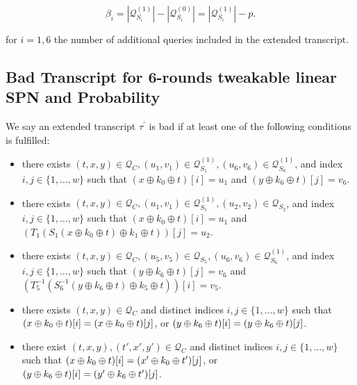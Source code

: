 $$
\beta_{i}=\left|\mathcal{Q}_{S_{i}}^{(1)}\right|-\left|\mathcal{Q}_{S_{i}}^{(0)}\right|=\left|\mathcal{Q}_{S_{i}}^{(1)}\right|-p.
$$

for $i=1, 6$ the number of additional queries included in the extended transcript.\\

\subsection{Bad Transcript for 6-rounds tweakable linear SPN and Probability}

\noindent We say an extended transcript $\tau^{\prime}$ is bad if at least one of the following conditions is fulfilled:

\begin{itemize}
  \item\eone
  there exists $(t, x, y) \in \mathcal{Q}_{C}, \left(u_{1}, v_{1}\right) \in \mathcal{Q}_{S_{1}}^{(1)}, \left(u_{6}, v_{6}\right) \in \mathcal{Q}_{S_{6}}^{(1)}$, and index $i, j \in \{1, \ldots, w\}$ such that $\left(x \oplus k_{0} \oplus t\right)[i]=u_1$ and $\left(y \oplus k_{6} \oplus t\right)[j]=v_6$.
  \item\etwo
  there exists $(t, x, y) \in \mathcal{Q}_{C}, \left(u_{1}, v_{1}\right) \in \mathcal{Q}_{S_{1}}^{(1)}, \left(u_{2}, v_{2}\right) \in \mathcal{Q}_{S_{2}}$, and index $i, j \in \{1, \ldots, w\}$ such that $\left(x \oplus k_{0} \oplus t\right)[i]=u_1$ and $\left(T_{1}\left(S_{1}\left(x \oplus k_{0} \oplus t\right) \oplus k_{1} \oplus t\right)\right)[j]=u_2$.
  \item\ethree
  there exists $(t, x, y) \in \mathcal{Q}_{C}, \left(u_{5}, v_{5}\right) \in \mathcal{Q}_{S_{5}}, \left(u_{6}, v_{6}\right) \in \mathcal{Q}_{S_{6}}^{(1)}$, and index $i, j \in \{1, \ldots, w\}$ such that $\left(y \oplus k_{6} \oplus t\right)[j]=v_6$ and $\left(T_{5}^{-1}\left(S_{6}^{-1}\left(y \oplus k_{6} \oplus t\right) \oplus k_{5} \oplus t\right)\right)[i]=v_5$.
  \item\efour 
  there exists $(t, x, y) \in \mathcal{Q}_{C}$ and distinct indices $i, j \in \{1, \ldots, w\}$ such that $(x\oplus k_0 \oplus t)[i]=(x\oplus k_0 \oplus t)[j]$, or $(y\oplus k_6 \oplus t)[i]=(y\oplus k_6 \oplus t)[j]$.
  \item\efive
  there exist $(t, x, y), (t', x', y') \in \mathcal{Q}_{C}$ and distinct indices $i, j \in \{1, \ldots, w\}$ such that $(x\oplus k_0 \oplus t)[i]=(x' \oplus k_0 \oplus t')[j]$, or $(y\oplus k_6 \oplus t)[i]=(y' \oplus k_6 \oplus t')[j]$.
\end{itemize}

